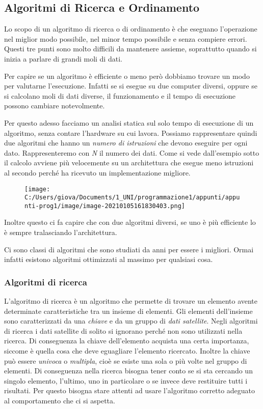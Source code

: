 \documentclass[
]{article}
\begin{document}
\hypertarget{header-n1505}{%
\subsection{Algoritmi di Ricerca e Ordinamento}\label{header-n1505}}

Lo scopo di un algoritmo di ricerca o di ordinamento è che eseguano
l'operazione nel miglior modo possibile, nel minor tempo possibile e
senza compiere errori. Questi tre punti sono molto difficili da
mantenere assieme, soprattutto quando si inizia a parlare di grandi moli
di dati.

Per capire se un algoritmo è efficiente o meno però dobbiamo trovare un
modo per valutarne l'esecuzione. Infatti se si esegue su due computer
diversi, oppure se si calcolano moli di dati diverse, il funzionamento e
il tempo di esecuzione possono cambiare notevolmente.

Per questo adesso facciamo un analisi statica sul solo tempo di
esecuzione di un algoritmo, senza contare l'hardware su cui lavora.
Possiamo rappresentare quindi due algoritmi che hanno un \emph{numero di
istruzioni} che devono eseguire per ogni dato. Rappresenteremo con
\emph{N} il numero dei dati. Come si vede dall'esempio sotto il calcolo
avviene più velocemente su un architettura che esegue meno istruzioni al
secondo perché ha ricevuto un implementazione migliore.

\begin{figure}
\centering
\texttt{[image: C:/Users/giova/Documents/1\_UNI/programmazione1/appunti/appunti-prog1/image/image-20210105161830403.png]}
\caption{}
\end{figure}

Inoltre questo ci fa capire che con due algoritmi diversi, se uno è più
efficiente lo è sempre tralasciando l'architettura.

Ci sono classi di algoritmi che sono studiati da anni per essere i
migliori. Ormai infatti esistono algoritmi ottimizzati al massimo per
qualsiasi cosa.

\hypertarget{header-n1513}{%
\subsubsection{Algoritmi di ricerca}\label{header-n1513}}

L'algoritmo di ricerca è un algoritmo che permette di trovare un
elemento avente determinate caratteristiche tra un insieme di elementi.
Gli elementi dell'insieme sono caratterizzati da una \emph{chiave} e da
un gruppo di \emph{dati satellite}. Negli algoritmi di ricerca i dati
satellite di solito si ignorano perché non sono utilizzati nella
ricerca. Di conseguenza la chiave dell'elemento acquista una certa
importanza, siccome è quella cosa che deve eguagliare l'elemento
ricercato. Inoltre la chiave può essere \emph{univoca} o
\emph{multipla}, cioè se esiste una sola o più volte nel gruppo di
elementi. Di conseguenza nella ricerca bisogna tener conto se si sta
cercando un singolo elemento, l'ultimo, uno in particolare o se invece
deve restituire tutti i risultati. Per questo bisogna stare attenti ad
usare l'algoritmo corretto adeguato al comportamento che ci si aspetta.
\end{document}

